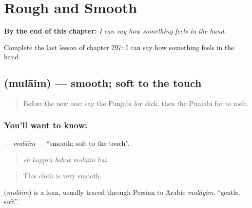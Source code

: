 
\chapter{Rough and Smooth}
\label{ch:pa-a2-rough-and-smooth}

\begin{chapteropening}
\textbf{By the end of this chapter:} \emph{I can say how something feels in the hand.}

Complete the last lesson of chapter 297: I can say how something feels in the hand.
\end{chapteropening}

\section[\texorpdfstring{\pa{ਮੁਲਾਇਮ} (mulāim)}{ਮੁਲਾਇਮ (mulāim)}]{ (mulāim) — smooth; soft to the touch}

\label{lesson:PA-C297-mulaim}



\begin{quote}
Before the new one: say the Punjabi for slick, then the Punjabi for to melt.
\end{quote}

\subsection*{You'll want to know: }
\textbf{} — \emph{mulāim} — \textquotedblleft{}smooth; soft to the touch\textquotedblright{}.

\begin{quote}
    
\end{quote}

\begin{quote}
\emph{eh kappṛā bahut mulāim hai.}
\end{quote}

\begin{quote}
This cloth is very smooth.
\end{quote}

\begin{cousinweb}
\textbf{} (\emph{mulāim}) is a loan, usually traced through Persian to Arabic \emph{mulāyim}, \textquotedblleft{}gentle, soft\textquotedblright{}.
\end{cousinweb}

